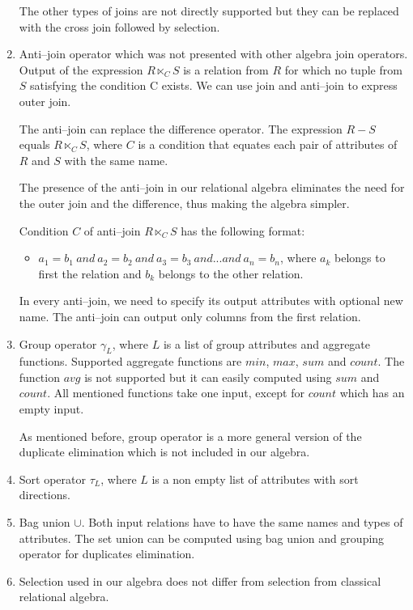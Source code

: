 \begin{enumerate}
The other types of joins are not directly supported but they can be replaced with the cross join followed by selection.
\item Anti--join operator which was not presented with other algebra join operators. Output of the expression $R \ltimes_C S$ is a relation from $R$ for which no tuple from $S$ satisfying the condition C exists. We can use join and anti--join to express outer join.
 
 
 
The anti--join can replace the difference operator. The expression $R-S$ equals $R \ltimes_C S$, where $C$ is a condition that equates each pair of attributes of $R$ and $S$ with the same name.
 
The presence of the anti--join in our relational algebra eliminates the need for the outer join and the difference, thus making the algebra simpler.

Condition $C$ of anti--join $R \ltimes_C S$ has the following format:
\begin{itemize}
\item $a_1=b_1~and~a_2=b_2~and~a_3=b_3~and...and~a_n=b_n$, where $a_k$ belongs to first the relation and $b_k$ belongs to the other relation.
\end{itemize}
In every anti--join, we need to specify its output attributes with optional new name. The anti--join can output only columns from the first relation. 
\item Group operator $\gamma_L$, where $L$ is a list of group attributes and aggregate functions. Supported aggregate functions are $min$, $max$, $sum$ and $count$. The function $avg$ is not supported but it can easily computed using $sum$ and $count$. All mentioned functions take one input, except for $count$ which has an empty input.

As mentioned before, group operator is a more general version of the duplicate elimination which is not included in our algebra.
\item Sort operator $\tau_L$, where $L$ is a non empty list of attributes with sort directions.
\item Bag union $\cup$. Both input relations have to have the same names and types of attributes. The set union can be computed using bag union and grouping operator for duplicates elimination.
\item Selection used in our algebra does not differ from selection from classical relational algebra.

\end{enumerate}


